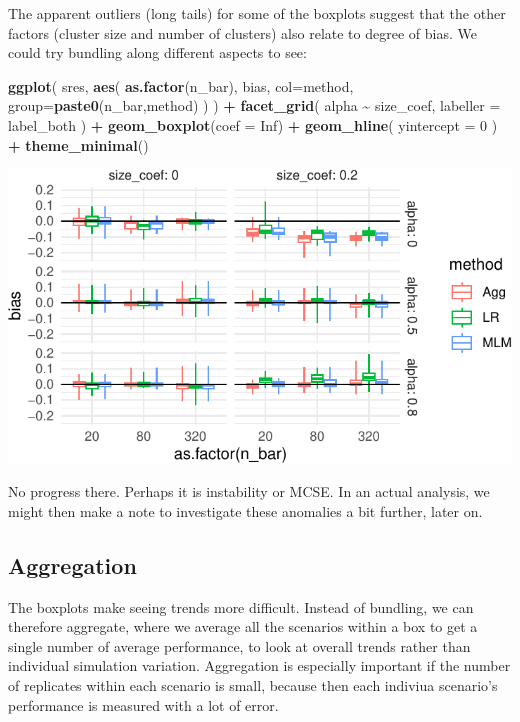 \documentclass[
]{book}
\newenvironment{Shaded}{\begin{snugshade}}{\end{snugshade}}
\newcommand{\AttributeTok}[1]{\textcolor[rgb]{0.13,0.29,0.53}{#1}}
\newcommand{\ConstantTok}[1]{\textcolor[rgb]{0.56,0.35,0.01}{#1}}
\newcommand{\DecValTok}[1]{\textcolor[rgb]{0.00,0.00,0.81}{#1}}
\newcommand{\FunctionTok}[1]{\textcolor[rgb]{0.13,0.29,0.53}{\textbf{#1}}}
\newcommand{\NormalTok}[1]{#1}
\newcommand{\SpecialCharTok}[1]{\textcolor[rgb]{0.81,0.36,0.00}{\textbf{#1}}}
\begin{document}
The apparent outliers (long tails) for some of the boxplots suggest that the other factors (cluster size and number of clusters) also relate to degree of bias. We could try bundling along different aspects to see:

\begin{Shaded}
\begin{Highlighting}[]
\FunctionTok{ggplot}\NormalTok{( sres, }\FunctionTok{aes}\NormalTok{( }\FunctionTok{as.factor}\NormalTok{(n\_bar), bias, }\AttributeTok{col=}\NormalTok{method, }\AttributeTok{group=}\FunctionTok{paste0}\NormalTok{(n\_bar,method) ) ) }\SpecialCharTok{+}
  \FunctionTok{facet\_grid}\NormalTok{( alpha }\SpecialCharTok{\textasciitilde{}}\NormalTok{  size\_coef, }\AttributeTok{labeller =}\NormalTok{ label\_both ) }\SpecialCharTok{+}
  \FunctionTok{geom\_boxplot}\NormalTok{(}\AttributeTok{coef =} \ConstantTok{Inf}\NormalTok{) }\SpecialCharTok{+}
  \FunctionTok{geom\_hline}\NormalTok{( }\AttributeTok{yintercept =} \DecValTok{0}\NormalTok{ ) }\SpecialCharTok{+}
  \FunctionTok{theme\_minimal}\NormalTok{()}
\end{Highlighting}
\end{Shaded}

\begin{center}\includegraphics[width=0.75\linewidth]{Designing-Simulations-in-R_files/figure-latex/clusterRCT_plot_bias_v2-1} \end{center}

No progress there. Perhaps it is instability or MCSE.
In an actual analysis, we might then make a note to investigate these anomalies a bit further, later on.

\subsection{Aggregation}\label{aggregation}

The boxplots make seeing trends more difficult.
Instead of bundling, we can therefore aggregate, where we average all the scenarios within a box to get a single number of average performance, to look at overall trends rather than individual simulation variation.
Aggregation is especially important if the number of replicates within each scenario is small, because then each indiviua scenario's performance is measured with a lot of error.
\end{document}
